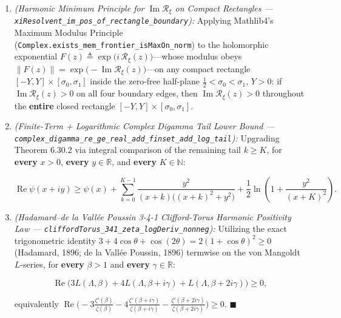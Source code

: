 \documentclass[
  11pt,
]{article}
\begin{document}
\begin{enumerate}
\def\labelenumi{\arabic{enumi}.}
\item
  \emph{(Harmonic Minimum Principle for
  \(\operatorname{Im}\mathcal{R}_\xi\) on Compact Rectangles ---
  \texttt{xiResolvent\_im\_pos\_of\_rectangle\_boundary}):} Applying
  Mathlib4's Maximum Modulus Principle
  (\texttt{Complex.exists\_mem\_frontier\_isMaxOn\_norm}) to the
  holomorphic exponential
  \(F(z) \triangleq \exp\!\big(i\,\mathcal{R}_\xi(z)\big)\)---whose
  modulus obeys
  \(\|F(z)\| = \exp\!\big(-\operatorname{Im}\mathcal{R}_\xi(z)\big)\)---on
  any compact rectangle \([-Y, Y] \times [\sigma_0, \sigma_1]\) inside
  the zero-free half-plane \(\frac{1}{2} < \sigma_0 < \sigma_1\),
  \(Y > 0\): if \(\operatorname{Im}\mathcal{R}_\xi(z) > 0\) on all four
  boundary edges, then \(\operatorname{Im}\mathcal{R}_\xi(z) > 0\)
  throughout the \textbf{entire} closed rectangle
  \([-Y, Y] \times [\sigma_0, \sigma_1]\).
\item
  \emph{(Finite-Term + Logarithmic Complex Digamma Tail Lower Bound ---
  \texttt{complex\_digamma\_re\_ge\_real\_add\_finset\_add\_log\_tail}):}
  Upgrading Theorem 6.30.2 via integral comparison of the remaining tail
  \(k \ge K\), for \textbf{every} \(x > 0\), \textbf{every}
  \(y \in \mathbb{R}\), and \textbf{every} \(K \in \mathbb{N}\):

  \[\operatorname{Re}\psi(x + iy) \ge \psi(x) + \sum_{k=0}^{K-1}\frac{y^2}{(x + k)\big((x + k)^2 + y^2\big)} + \frac{1}{2}\ln\!\left(1 + \frac{y^2}{(x + K)^2}\right).\]
\item
  \emph{(Hadamard--de la Vallée Poussin 3-4-1 Clifford-Torus Harmonic
  Positivity Law ---
  \texttt{cliffordTorus\_341\_zeta\_logDeriv\_nonneg}):} Utilizing the
  exact trigonometric identity
  \(3 + 4\cos\theta + \cos(2\theta) = 2(1 + \cos\theta)^2 \ge 0\)
  (Hadamard, 1896; de la Vallée Poussin, 1896) termwise on the von
  Mangoldt \(L\)-series, for \textbf{every} \(\beta > 1\) and
  \textbf{every} \(\gamma \in \mathbb{R}\):

  \[\operatorname{Re}\!\Big(3 L(\Lambda, \beta) + 4 L(\Lambda, \beta + i\gamma) + L(\Lambda, \beta + 2i\gamma)\Big) \ge 0,\]

  equivalently
  \(\operatorname{Re}\!\Big(-3\frac{\zeta'(\beta)}{\zeta(\beta)} - 4\frac{\zeta'(\beta + i\gamma)}{\zeta(\beta + i\gamma)} - \frac{\zeta'(\beta + 2i\gamma)}{\zeta(\beta + 2i\gamma)}\Big) \ge 0\).
  \(\blacksquare\)
\end{enumerate}
\end{document}
